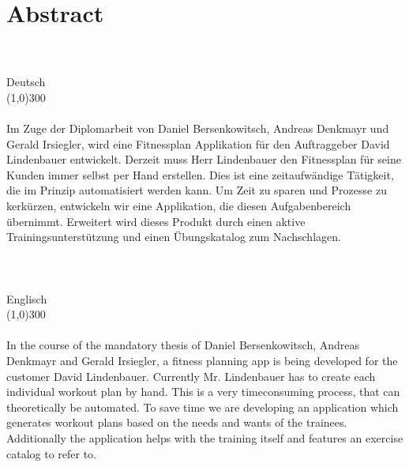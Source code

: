\documentclass[FIPLY_base.tex]{subfiles}
\begin{document}
	\section{Abstract}
	\ \\
	\ \\
	{\LARGE Deutsch}
	\ \\
	\line(1,0){300}
	\ \\
	\ \\
	Im Zuge der Diplomarbeit von Daniel Bersenkowitsch, Andreas Denkmayr und Gerald Irsiegler, wird eine Fitnessplan Applikation für den Auftraggeber David Lindenbauer entwickelt. Derzeit muss Herr Lindenbauer den Fitnessplan für seine Kunden immer selbst per Hand erstellen. Dies ist eine zeitaufwändige Tätigkeit, die im Prinzip automatisiert werden kann. Um Zeit zu sparen und Prozesse zu kerkürzen, entwickeln wir eine Applikation, die diesen Aufgabenbereich übernimmt. Erweitert wird dieses Produkt durch einen aktive Trainingsunterstützung und einen Übungskatalog zum Nachschlagen. 
	\ \\
	\ \\
	\ \\
	\ \\
	{\LARGE Englisch}
	\ \\
	\line(1,0){300}
	\ \\ 
	\ \\
	In the course of the mandatory thesis of Daniel Bersenkowitsch, Andreas Denkmayr and Gerald Irsiegler, a fitness planning app is being developed for the customer David Lindenbauer. Currently Mr. Lindenbauer has to create each individual workout plan by hand. This is a very timeconsuming process, that can theoretically be automated. To save time we are developing an application which generates workout plans based on the needs and wants of the trainees. Additionally the application helps with the training itself and features an exercise catalog to refer to.
\end{document}
